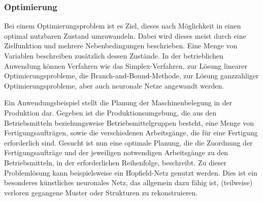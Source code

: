 \documentclass[twoside,a4paper,draft]{article}
\begin{document}
\subsubsection{Optimierung}

Bei einem Optimierungsproblem ist es Ziel, dieses nach Möglichkeit in einen optimal nutzbaren Zustand umzuwandeln. Dabei wird dieses meist durch eine Zielfunktion und mehrere Nebenbedingungen beschrieben. Eine Menge von Variablen beschreiben zusätzlich dessen Zustände. In der betrieblichen Anwendung können Verfahren wie das Simplex-Verfahren, zur Lösung linearer Optimierungsprobleme, die Branch-and-Bound-Methode, zur Lösung ganzzahliger Optimierungsprobleme, aber auch neuronale Netze angewandt werden.

Ein Anwendungsbeispiel stellt die Planung der Maschinenbelegung in der Produktion dar. Gegeben ist die Produktionsumgebung, die aus den Betriebsmitteln beziehungsweise Betriebsmittelgruppen besteht, eine Menge von Fertigungsaufträgen, sowie die verschiedenen Arbeitsgänge, die für eine Fertigung erforderlich sind. Gesucht ist nun eine optimale Planung, die die Zuordnung der Fertigungsaufträge und der jeweiligen notwendigen Arbeitsgänge zu den Betriebsmitteln, in der erforderlichen Reihenfolge, beschreibt. Zu dieser Problemlösung kann beispielsweise ein Hopfield-Netz genutzt werden. Dies ist ein besonderes künstliches neuronales Netz, das allgemein dazu fähig ist, (teilweise) verloren gegangene Muster oder Strukturen zu rekonstruieren.
\end{document}
